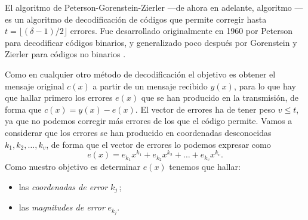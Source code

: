 El algoritmo de Peterson-Gorenstein-Zierler —de ahora en adelante, algoritmo — es un algoritmo de decodificación de códigos  que permite corregir hasta \(t = \lfloor (\delta - 1)/2 \rfloor\) errores.
Fue desarrollado originalmente en 1960 por Peterson \parencite{peterson_encoding_1960} para decodificar códigos  binarios, y generalizado poco después por Gorenstein y Zierler para códigos no binarios \parencite{gorenstein_class_1961}.

Como en cualquier otro método de decodificación el objetivo es obtener el mensaje original \(c(x)\) a partir de un mensaje recibido \(y(x)\), para lo que hay que hallar primero los errores \(e(x)\) que se han producido en la transmisión, de forma que \(c(x) = y(x) - e(x)\).
El vector de errores ha de tener peso \(v \leq t\), ya que no podemos corregir más errores de los que el código permite.
Vamos a considerar que los errores se han producido en coordenadas desconocidas \(k_1, k_2, \dots, k_v\), de forma que el vector de errores lo podemos expresar como
\[
  e(x) = e_{k_1}x^{k_1} + e_{k_2}x^{k_2} + \dots + e_{k_v}x^{k_v}.
\]
Como nuestro objetivo es determinar \(e(x)\) tenemos que hallar: \begin{itemize}
  \item las \textit{coordenadas de error} \(k_j\)\,;
  \item las \textit{magnitudes de error} \(e_{k_j}\).
\end{itemize}

